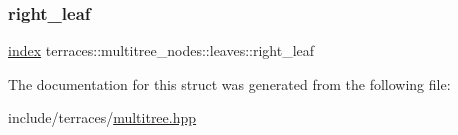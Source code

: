 \subsubsection{\texorpdfstring{right\+\_\+leaf}{right\_leaf}}
{\footnotesize\ttfamily \hyperlink{namespaceterraces_adbc33ccb543d1634e96d0eb02e472c77}{index} terraces\+::multitree\+\_\+nodes\+::leaves\+::right\+\_\+leaf}



The documentation for this struct was generated from the following file\+:\begin{DoxyCompactItemize}
\item 
include/terraces/\hyperlink{multitree_8hpp}{multitree.\+hpp}\end{DoxyCompactItemize}
